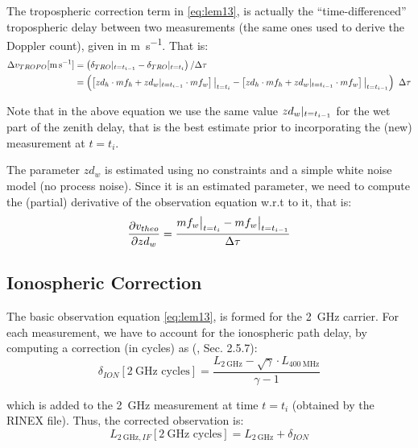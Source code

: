 The tropospheric correction term in \ref{eq:lem13}, is actually the ``time-differenced'' 
tropospheric delay between two measurements (the same ones used to derive the 
Doppler count), given in \si{\m \per \s}. That is:
\begin{equation}
  \begin{aligned}
    \Delta v_{TROPO} [\si{\m \per \s}] 
      &= \left( \delta _{TRO} \at{t=t_{i-1}} - \delta _{TRO} \at{t=t_{i}} \right) / \Delta \tau\\
      &= \left( \left[ zd_{h} \cdot mf_{h} + zd_{w}\at{t=t_{i-1}} \cdot mf_{w} \right]\at[\big]{t=t_i} - 
        \left[ zd_{h} \cdot mf_{h} + zd_{w}\at{t=t_{i-1}} \cdot mf_{w} \right]\at[\big]{t=t_{i-1}} \right) \ \Delta \tau
    \label{eq:dtrop-diff}
  \end{aligned}
\end{equation}

Note that in the above equation we use the same value $zd_{w}|_{t=t_{i-1}}$ 
for the wet part of the zenith delay, that is the best estimate prior to 
incorporating the (new) measurement at $t=t_i$.

The parameter $zd_{w}$ is estimated using no constraints and a simple white 
noise model (no process noise). Since it is an estimated parameter, we need 
to compute the (partial) derivative of the observation equation w.r.t to it, 
that is:
\begin{equation}
  \frac{\partial v_{theo}}{\partial zd_{w}} = \frac{mf_{w}\at[\big]{t=t_i} 
    - mf_{w}\at[\big]{t=t_{i-1}}}{\Delta \tau}
  \label{eq:partials-zwd}
\end{equation}

\subsection{Ionospheric Correction}
\label{ssec:iono-correction}
The basic observation equation \ref{eq:lem13}, is formed for the \SI{2}{\GHz} 
carrier. For each measurement, we have to account for the ionospheric path 
delay, by computing a correction (in cycles) as (\cite{lemoine-2016}, Sec. 2.5.7):
\begin{equation}
  \delta_{ION} [\SI{2}{\GHz}\text{ cycles}] = 
    \frac{L_{\SI{2}{\GHz}} - \sqrt{\gamma} \cdot L_{\SI{400}{\MHz}}}{\gamma - 1}
  \label{eq:iono-delay-cycles}
\end{equation}

which is added to the \SI{2}{\GHz} measurement at time $t=t_i$ (obtained by the 
RINEX file). Thus, the corrected observation is:
\begin{equation}
  L_{\SI{2}{\GHz},IF} [\SI{2}{\GHz}\text{ cycles}] = 
    L_{\SI{2}{\GHz}} + \delta_{ION}
  \label{eq:l2if}
\end{equation}

